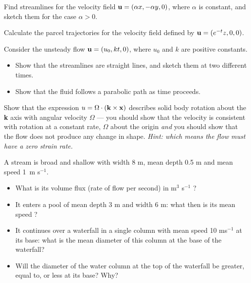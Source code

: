 \documentclass[10pt]{report}
\begin{document}

\begin{questionstar}
Find streamlines for the velocity field ${{\bf u}}=(\alpha x,-\alpha y,0)$,
where $\alpha $ is constant, and sketch them for the case $\alpha  > 0$.
\label{qn:streamlines1}
\end{questionstar}

\begin{questionstar}
Calculate the parcel trajectories for the velocity field defined by ${{\bf u}}=(e^{-t}z,0,0)$.
\label{qn:trajectories}
\end{questionstar}

\begin{questionstar}
Consider the unsteady flow ${{\bf u}}=(u_0 ,kt,0)$, where $u_{0}$ and $k$ are positive constants.
\begin{itemize}
\item Show that the streamlines are straight lines, and sketch them at two different times.
\item Show that the fluid follows a parabolic path as time proceeds.
\end{itemize}
\label{qn:streamlines-time}
\end{questionstar}


\begin{question}
	Show that the expression $u=\Omega \cdot ({\bf k}\times {\bf x})$ describes solid body rotation
	about the\textbf{ k} axis with angular velocity $\Omega $ --- you should show that the velocity
	is consistent with rotation at a constant rate, $\Omega$ about the origin \textit{and} you should
	show that the flow does not produce any change in shape.
	\textit{Hint: which means the flow must have a zero strain rate.}
\label{qn:rigidbody}
\end{question}

\begin{question}
 A stream is broad and shallow with width 8 m, mean depth 0.5 m and mean speed 1~m s$^{-1}$.
 \begin{itemize}
 \item What is its volume flux (rate of flow per second) in m$^{3}$ s$^{-1}$ ?
 \item It enters a pool of mean depth 3 m and width 6 m: what then is its mean speed ?
 \item It continues over a waterfall in a single column with mean speed 10 ms$^{-1}$ at its base: what is the mean diameter of this column at the base of the waterfall?
 \item Will the diameter of the water column at the top of the waterfall be greater, equal to, or less at its base? Why?
 \end{itemize}
\label{qn:fluxes}
\end{question}
\end{document}
